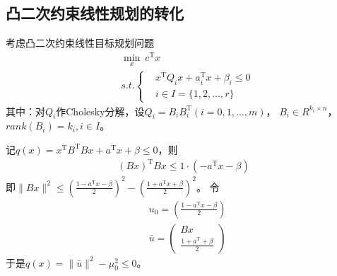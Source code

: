     \subsection{凸二次约束线性规划的转化}
        \par
        考虑凸二次约束线性目标规划问题
        \begin{align*}
          & \mathop{\min}\limits_x \  c^\mathrm{T} x\\
          & s.t.\left\{
            \begin{aligned}
             &x^\mathrm{T} Q_i x+a_i^\mathrm{T} x+{\beta}_i \leqslant 0\\
             &i \in I=\{1,2,\ldots,r\}
            \end{aligned}
             \right.
        \end{align*}
        其中：对$Q_i$作Cholesky分解，设$Q_i=B_iB_i^\mathrm{T} (i=0,1,\ldots,m)$，
        $B_i \in R^{k_i\times n}$，$rank(B_i)=k_i,i \in I$。
        \par
        记$q(x)=x^\mathrm{T} B^\mathrm{T} Bx+a^\mathrm{T} x+\beta \leqslant 0$，则
        \begin{align*}
          (Bx)^\mathrm{T} Bx \leqslant 1\cdot (-a^\mathrm{T} x-\beta)
        \end{align*}
        即$\|Bx\|^2 \leqslant (\frac{1-a^\mathrm{T}x -\beta}{2})^2-(\frac{1+a^\mathrm{T}x +\beta}{2})^2$。
        令
        \begin{align*}
          &u_0= \left( \frac{1-a^\mathrm{T} x-\beta}{2} \right) \\
          &\bar{u}=\begin{pmatrix} Bx \\\frac{1+a^\mathrm{T} +\beta}{2}\end{pmatrix}
        \end{align*}
        于是$q(x)=\|\bar{u}\|^2-{\mu}_0^2 \leqslant 0$。
